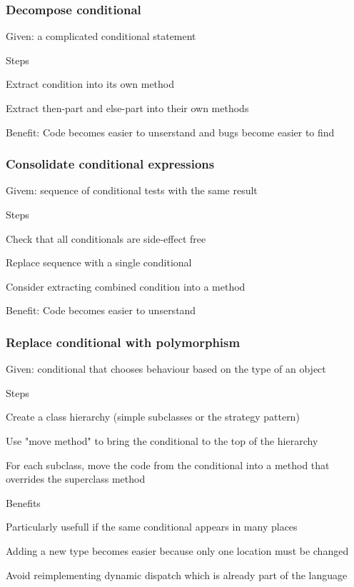 \documentclass[10pt]{article}
\begin{document}
\subsubsection{Decompose conditional}
\enumstart
	\item Given: a complicated conditional statement
	\item Steps
	\enumstart
		\item Extract condition into its own method
		\item Extract then-part and else-part into their own methods
	\enumend
	\item Benefit: Code becomes easier to unserstand and bugs become easier to find
\enumend

\subsubsection{Consolidate conditional expressions}
\enumstart
	\item Givem: sequence of conditional tests with the same result
	\item Steps
	\enumstart
		\item Check that all conditionals are side-effect free
		\item Replace sequence with a single conditional
		\item Consider extracting combined condition into a method
	\enumend
	\item Benefit: Code becomes easier to unserstand
\enumend

\subsubsection{Replace conditional with polymorphism}
\enumstart
	\item Given: conditional that chooses behaviour based on the type of an object
	\item Steps
	\enumstart
		\item Create a class hierarchy (simple subclasses or the strategy pattern)
		\item Use "move method" to bring the conditional to the top of the hierarchy
		\item For each subclass, move the code from the conditional into a method that overrides the superclass method
	\enumend
	\item Benefits
	\enumstart
		\item Particularly usefull if the same conditional appears in many places
		\item Adding a new type becomes easier because only one location must be changed
		\item Avoid reimplementing dynamic dispatch which is already part of the language
	\enumend
\enumend
\end{document}
